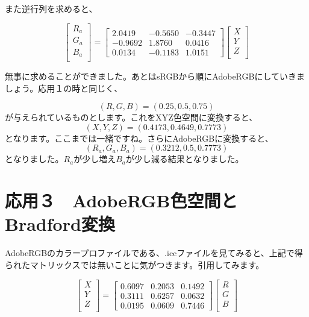 \documentclass[12pt]{jsarticle}
\begin{document}
また逆行列を求めると、

\[
\begin{bmatrix}
R_{a} \\
G_{a} \\
B_{a} \\
\end{bmatrix}
=
\begin{bmatrix}
2.0419 & -0.5650 & -0.3447 \\
-0.9692 & 1.8760 & 0.0416 \\
0.0134 & -0.1183 & 1.0151
\end{bmatrix}
\begin{bmatrix}
X \\
Y \\
Z \\
\end{bmatrix}
\]

無事に求めることができました。あとはsRGBから順にAdobeRGBにしていきましょう。応用１の時と同じく、

\[
(R,G,B) = (0.25, 0.5, 0.75)
\]
が与えられているものとします。これをXYZ色空間に変換すると、
\[
(X,Y,Z) = (0.4173, 0.4649, 0.7773)
\]
となります。ここまでは一緒ですね。さらにAdobeRGBに変換すると、
\[
(R_{a},G_{a},B_{a}) = (0.3212, 0.5, 0.7773)
\]
となりました。$R_{a}$が少し増え$B_{a}$が少し減る結果となりました。

\section{応用３　AdobeRGB色空間とBradford変換}

AdobeRGBのカラープロファイルである、.iccファイルを見てみると、上記で得られたマトリックスでは無いことに気がつきます。引用してみます。

\begin{equation}
\begin{bmatrix}
X \\
Y \\
Z \\
\end{bmatrix}
=
\begin{bmatrix}
0.6097 & 0.2053 & 0.1492 \\
0.3111 & 0.6257 & 0.0632 \\
0.0195 & 0.0609 & 0.7446
\end{bmatrix}
\begin{bmatrix}
R \\
G \\
B \\
\end{bmatrix}
\label{eq:AdobeRGB_icc}
\end{equation}
\end{document}
